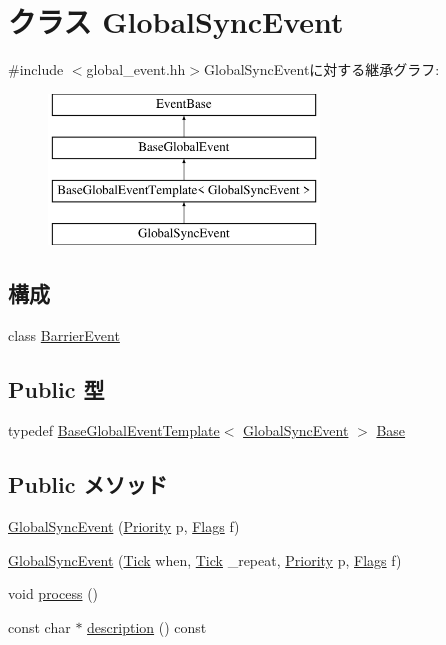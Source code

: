 \hypertarget{classGlobalSyncEvent}{
\section{クラス GlobalSyncEvent}
\label{classGlobalSyncEvent}
}


{\ttfamily \#include $<$global\_\-event.hh$>$}GlobalSyncEventに対する継承グラフ:\begin{figure}[H]
\begin{center}
\leavevmode
\includegraphics[height=4cm]{classGlobalSyncEvent}
\end{center}
\end{figure}
\subsection*{構成}
\begin{DoxyCompactItemize}
\item 
class \hyperlink{classGlobalSyncEvent_1_1BarrierEvent}{BarrierEvent}
\end{DoxyCompactItemize}
\subsection*{Public 型}
\begin{DoxyCompactItemize}
\item 
typedef \hyperlink{classBaseGlobalEventTemplate}{BaseGlobalEventTemplate}$<$ \hyperlink{classGlobalSyncEvent}{GlobalSyncEvent} $>$ \hyperlink{classGlobalSyncEvent_ad39529d6bdef8a3698085739963cfbec}{Base}
\end{DoxyCompactItemize}
\subsection*{Public メソッド}
\begin{DoxyCompactItemize}
\item 
\hyperlink{classGlobalSyncEvent_a408a501bdc8b56cd2903f78f337135ee}{GlobalSyncEvent} (\hyperlink{classEventBase_a6d92f7ee8144a5911ed46d85a89a4934}{Priority} p, \hyperlink{classFlags}{Flags} f)
\item 
\hyperlink{classGlobalSyncEvent_a9c04aecb6b4ee404eb536a731e3cc64e}{GlobalSyncEvent} (\hyperlink{base_2types_8hh_a5c8ed81b7d238c9083e1037ba6d61643}{Tick} when, \hyperlink{base_2types_8hh_a5c8ed81b7d238c9083e1037ba6d61643}{Tick} \_\-repeat, \hyperlink{classEventBase_a6d92f7ee8144a5911ed46d85a89a4934}{Priority} p, \hyperlink{classFlags}{Flags} f)
\item 
void \hyperlink{classGlobalSyncEvent_a2e9c5136d19b1a95fc427e0852deab5c}{process} ()
\item 
const char $\ast$ \hyperlink{classGlobalSyncEvent_a5a14fe478e2393ff51f02e9b7be27e00}{description} () const 
\end{DoxyCompactItemize}
